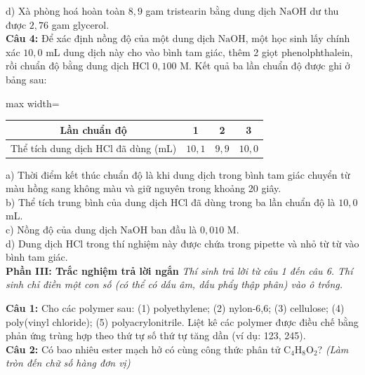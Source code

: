 \documentclass[12pt,a4paper]{article}
\begin{document}
\noindent d) Xà phòng hoá hoàn toàn $8{,}9$ gam tristearin bằng dung dịch $\text{NaOH}$ dư thu được $2{,}76$ gam glycerol.\\

\noindent \textbf{Câu 4:} Để xác định nồng độ của một dung dịch $\text{NaOH}$, một học sinh lấy chính xác $10{,}0$ mL dung dịch này cho vào bình tam giác, thêm 2 giọt phenolphthalein, rồi chuẩn độ bằng dung dịch $\text{HCl}$ $0{,}100$ M. Kết quả ba lần chuẩn độ được ghi ở bảng sau:\\
\begin{center}
\begin{adjustbox}{max width=\linewidth}
\begin{tabular}{|c|c|c|c|}
\hline
Lần chuẩn độ & 1 & 2 & 3 \\
\hline
Thể tích dung dịch $\text{HCl}$ đã dùng (mL) & $10{,}1$ & $9{,}9$ & $10{,}0$ \\
\hline
\end{tabular}
\end{adjustbox}
\end{center}
\noindent a) Thời điểm kết thúc chuẩn độ là khi dung dịch trong bình tam giác chuyển từ màu hồng sang không màu và giữ nguyên trong khoảng 20 giây.\\

\noindent b) Thể tích trung bình của dung dịch $\text{HCl}$ đã dùng trong ba lần chuẩn độ là $10{,}0$ mL.\\

\noindent c) Nồng độ của dung dịch $\text{NaOH}$ ban đầu là $0{,}010$ M.\\

\noindent d) Dung dịch $\text{HCl}$ trong thí nghiệm này được chứa trong pipette và nhỏ từ từ vào bình tam giác.\\

\vspace{0.5cm}
\textbf{Phần III: Trắc nghiệm trả lời ngắn} \textit{Thí sinh trả lời từ câu 1 đến câu 6. Thí sinh chỉ điền một con số (có thể có dấu âm, dấu phẩy thập phân) vào ô trống.}

\noindent \textbf{Câu 1:} Cho các polymer sau: (1) polyethylene; (2) nylon-6,6; (3) cellulose; (4) poly(vinyl chloride); (5) polyacrylonitrile. Liệt kê các polymer được điều chế bằng phản ứng trùng hợp theo thứ tự số thứ tự tăng dần (ví dụ: 123, 245).\\

\noindent \textbf{Câu 2:} Có bao nhiêu ester mạch hở có cùng công thức phân tử $\text{C}_4\text{H}_8\text{O}_2$? \textit{(Làm tròn đến chữ số hàng đơn vị)}\\
\end{document}
